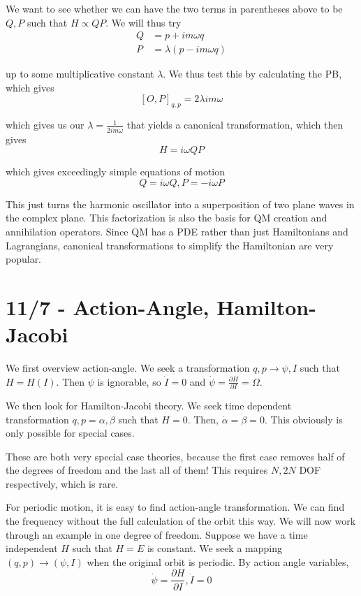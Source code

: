 \documentclass[10pt]{report}
\newcommand{\pd}[2]{\frac{\partial #1}{\partial#2}}
\begin{document}
We want to see whether we can have the two terms in parentheses above to be $Q,P$ such that $H\propto QP$. We will thus try
\begin{align*}
    Q &= p + im\omega q\\
    P &= \lambda(p-im\omega q)
\end{align*}

up to some multiplicative constant $\lambda$. We thus test this by calculating the PB, which gives
$$\left[ O,P \right]_{q,p} = 2\lambda im\omega$$

which gives us our $\lambda = \frac{1}{2im\omega}$ that yields a canonical transformation, which then gives
$$H = i\omega QP$$

which gives exceedingly simple equations of motion
$$Q=i\omega Q, P = -i\omega P$$

This just turns the harmonic oscillator into a superposition of two plane waves in the complex plane. This factorization is also the basis for QM creation and annihilation operators. Since QM has a PDE rather than just Hamiltonians and Lagrangians, canonical transformations to simplify the Hamiltonian are very popular.

\chapter{11/7 - Action-Angle, Hamilton-Jacobi}

We first overview action-angle. We seek a transformation $q,p \to \psi, I$ such that $H = H(I)$. Then $\psi$ is ignorable, so $\dot{I} = 0$ and $\dot{\psi} = \pd{H}{I} = \Omega$.

We then look for Hamilton-Jacobi theory. We seek time dependent transformation $q,p = \alpha, \beta$ such that $H = 0$. Then, $\dot{\alpha} = \dot{\beta} = 0$. This obviously is only possible for special cases. 

These are both very special case theories, because the first case removes half of the degrees of freedom and the last all of them! This requires $N,2N$ DOF respectively, which is rare.

For periodic motion, it is easy to find action-angle transformation. We can find the frequency without the full calculation of the orbit this way. We will now work through an example in one degree of freedom. Suppose we have a time independent $H$ such that $H=E$ is constant. We seek a mapping $(q,p) \to (\psi,I)$ when the original orbit is periodic. By action angle variables, 
$$\dot{\psi} = \pd{H}{I}, \dot{I} = 0$$
\end{document}
